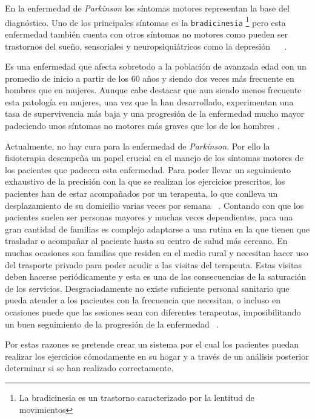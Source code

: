 
En la enfermedad de \textit{Parkinson} los síntomas motores representan la base del diagnóstico. Uno de los principales síntomas es la \texttt{bradicinesia} \footnote{La bradicinesia es un trastorno caracterizado por la lentitud de movimientos} pero esta enfermedad también cuenta con otros síntomas no motores como pueden ser trastornos del sueño, sensoriales y neuropsiquiátricos como la depresión ~\cite{enrique2019latencia} ~\cite{Parkinson1}.

Es una enfermedad que afecta sobretodo a la población de avanzada edad con un promedio de inicio a partir de los 60 años y siendo dos veces más frecuente en hombres que en mujeres. Aunque cabe destacar que aun siendo menos frecuente esta patología en mujeres, una vez que la han desarrollado, experimentan una tasa de supervivencia más baja y una progresión de la enfermedad mucho mayor padeciendo unos síntomas no motores más graves que los de los hombres \cite{ortiz2020diferencias}. 

Actualmente, no hay cura para la enfermedad de \textit{Parkinson}. Por ello la fisioterapia desempeña un papel crucial en el manejo de los síntomas motores de los pacientes que padecen esta enfermedad. Para poder llevar un seguimiento exhaustivo de la precisión con la que se realizan los ejercicios prescritos, los pacientes han de estar acompañados por un terapeuta, lo que conlleva un desplazamiento de su domicilio varias veces por semana ~\cite{saba2022guidelines}. Contando con que los pacientes suelen ser personas mayores y muchas veces dependientes, para una gran cantidad de familias es complejo adaptarse a una rutina en la que tienen que trasladar o acompañar al paciente hasta su centro de salud más cercano. En muchas ocasiones son familias que residen en el medio rural y necesitan hacer uso del trasporte privado para poder acudir a las visitas del terapeuta. 
Estas visitas deben hacerse periódicamente y esta es una de las consecuencias de la saturación de los servicios. Desgraciadamente no existe suficiente personal sanitario que pueda atender a los pacientes con la frecuencia que necesitan, o incluso en ocasiones puede que las sesiones sean con diferentes terapeutas, imposibilitando un buen seguimiento de la progresión de la enfermedad ~\cite{garcia2016informe}. 

Por estas razones se pretende crear un sistema por el cual los pacientes puedan realizar los ejercicios cómodamente en su hogar y a través de un análisis posterior determinar si se han realizado correctamente.

